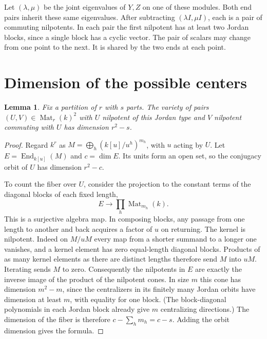 \documentclass[11pt,reqno]{amsart}
\newtheorem{lemma}[theorem]{Lemma}
\theoremstyle{definition}
\newcommand{\Mat}{\operatorname{Mat}}
\newcommand{\End}{\operatorname{End}}
\begin{document}
Let \((\lambda,\mu)\) be the joint eigenvalues of \(Y,Z\) on one of these
modules. Both end pairs inherit these same eigenvalues. After subtracting
\((\lambda I,\mu I)\), each is a pair of commuting nilpotents. In each
pair the first nilpotent has at least two Jordan blocks, since a single
block has a cyclic vector. The pair of scalars may change from one point to
the next. It is shared by the two ends at each point.

\section{Dimension of the possible centers}\label{sec:count}
\begin{lemma}\label{lem:stratum}
Fix a partition of \(r\) with \(s\) parts. The variety of pairs
\((U,V)\in\Mat_r(k)^2\) with \(U\) nilpotent of this Jordan type and
\(V\) nilpotent commuting with \(U\) has dimension \(r^2-s\).
\end{lemma}
\begin{proof}
Regard \(k^r\) as \(M=\bigoplus_h (k[u]/u^h)^{m_h}\), with \(u\)
acting by \(U\). Let \(E=\End_{k[u]}(M)\) and \(c=\dim E\). Its units
form an open set, so the conjugacy orbit of \(U\) has dimension \(r^2-c\).

To count the fiber over \(U\), consider the projection to the
constant terms of the diagonal blocks of each fixed length,
\[
                E\longrightarrow\prod_h \Mat_{m_h}(k).
\]
This is a surjective algebra map. In composing blocks, any passage from
one length to another and back acquires a factor of \(u\) on returning.
The kernel is nilpotent. Indeed on \(M/uM\) every map from a shorter
summand to a longer one vanishes, and a kernel element has zero
equal-length diagonal blocks. Products of as many kernel elements as
there are distinct lengths therefore send \(M\) into \(uM\). Iterating
sends \(M\) to zero. Consequently the nilpotents in \(E\) are exactly
the inverse image of the product of the nilpotent cones. In size \(m\)
this cone has dimension \(m^2-m\), since the centralizers in its finitely
many Jordan orbits have dimension at least \(m\), with equality for one block.
(The block-diagonal polynomials in each Jordan block already give
\(m\) centralizing directions.) The dimension of the fiber is therefore
\(c-\sum_h m_h=c-s\). Adding the orbit dimension gives the formula.
\end{proof}
\end{document}
